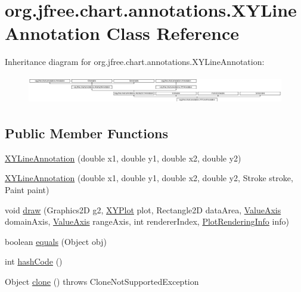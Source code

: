 \hypertarget{classorg_1_1jfree_1_1chart_1_1annotations_1_1_x_y_line_annotation}{}\section{org.\+jfree.\+chart.\+annotations.\+X\+Y\+Line\+Annotation Class Reference}
\label{classorg_1_1jfree_1_1chart_1_1annotations_1_1_x_y_line_annotation}
Inheritance diagram for org.\+jfree.\+chart.\+annotations.\+X\+Y\+Line\+Annotation\+:\begin{figure}[H]
\begin{center}
\leavevmode
\includegraphics[height=1.248607cm]{classorg_1_1jfree_1_1chart_1_1annotations_1_1_x_y_line_annotation}
\end{center}
\end{figure}
\subsection*{Public Member Functions}
\begin{DoxyCompactItemize}
\item 
\mbox{\hyperlink{classorg_1_1jfree_1_1chart_1_1annotations_1_1_x_y_line_annotation_a68dc6a5e5a4f72e94a0ae52b72c9058c}{X\+Y\+Line\+Annotation}} (double x1, double y1, double x2, double y2)
\item 
\mbox{\hyperlink{classorg_1_1jfree_1_1chart_1_1annotations_1_1_x_y_line_annotation_a33c8bd8fed90d3e0655a104d4c8315a3}{X\+Y\+Line\+Annotation}} (double x1, double y1, double x2, double y2, Stroke stroke, Paint paint)
\item 
void \mbox{\hyperlink{classorg_1_1jfree_1_1chart_1_1annotations_1_1_x_y_line_annotation_a4ff35300a56d36a0fa27cfd8e92c5c48}{draw}} (Graphics2D g2, \mbox{\hyperlink{classorg_1_1jfree_1_1chart_1_1plot_1_1_x_y_plot}{X\+Y\+Plot}} plot, Rectangle2D data\+Area, \mbox{\hyperlink{classorg_1_1jfree_1_1chart_1_1axis_1_1_value_axis}{Value\+Axis}} domain\+Axis, \mbox{\hyperlink{classorg_1_1jfree_1_1chart_1_1axis_1_1_value_axis}{Value\+Axis}} range\+Axis, int renderer\+Index, \mbox{\hyperlink{classorg_1_1jfree_1_1chart_1_1plot_1_1_plot_rendering_info}{Plot\+Rendering\+Info}} info)
\item 
boolean \mbox{\hyperlink{classorg_1_1jfree_1_1chart_1_1annotations_1_1_x_y_line_annotation_a9bb1d87e240fbd6f2edf678e64509ea7}{equals}} (Object obj)
\item 
int \mbox{\hyperlink{classorg_1_1jfree_1_1chart_1_1annotations_1_1_x_y_line_annotation_a0118ebaa2050bc41a505c86a2a4e2bfa}{hash\+Code}} ()
\item 
Object \mbox{\hyperlink{classorg_1_1jfree_1_1chart_1_1annotations_1_1_x_y_line_annotation_a9fe191b9077fa7af62f83768f8ec2bd3}{clone}} ()  throws Clone\+Not\+Supported\+Exception 
\end{DoxyCompactItemize}
